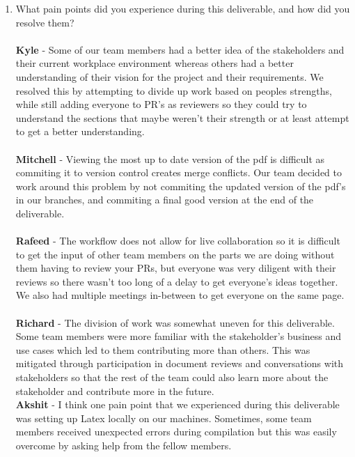 \documentclass[12pt]{article}
\begin{document}
\begin{enumerate}
    \item What pain points did you experience during this
      deliverable, and how did
      you resolve them? \\
      \\
      \textbf{Kyle} - Some of our team members had a better idea of the
      stakeholders and their current workplace environment whereas
      others had a better understanding of their vision for the project
      and their requirements. We resolved this by attempting to divide
      up work based on peoples strengths, while still adding everyone
      to PR's as reviewers so they could try to understand the sections
      that maybe weren't their strength or at least attempt to get a
      better understanding.\\
      \\
      \textbf{Mitchell} - Viewing the most up to date version of the
      pdf is difficult as commiting it to version control creates merge
      conflicts. Our team decided to work around this problem by not
      commiting the updated version of the pdf's in our branches, and
      commiting a final good version at the end of the deliverable.\\
      \\
      \textbf{Rafeed} - The workflow does not allow for live
      collaboration so it is difficult to get the input of other team
      members on the parts we are doing without them having to review
      your PRs, but everyone was very diligent with their reviews so
      there wasn't too long of a delay to get everyone's ideas
      together. We also had multiple meetings in-between to get
      everyone on the same page.\\
      \\
      \textbf{Richard} - The division of work was somewhat uneven for this
      deliverable. Some team members were more familiar with the stakeholder's
      business and use cases which led to them contributing more than others.
      This was mitigated through participation in document reviews and
      conversations with stakeholders so that the rest of the team could also
      learn more about the stakeholder and contribute more in the future.
      \\
      \textbf{Akshit} - I think one pain point that we experienced during this
      deliverable was setting up Latex locally on our machines.
      Sometimes, some team
      members received unexpected errors during compilation but this
      was easily overcome
      by asking help from the fellow members.\\

\end{enumerate}
\end{document}
